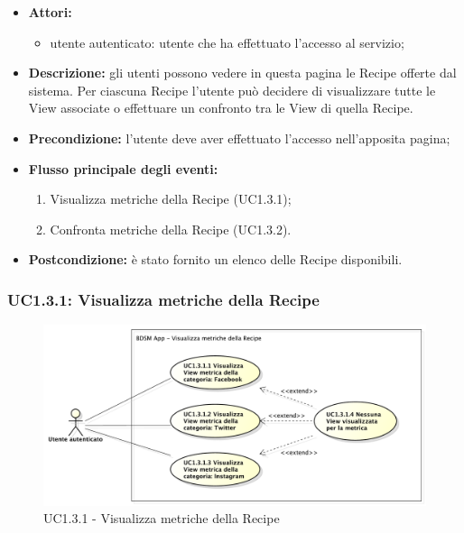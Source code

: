 \begin{itemize}
	\item \textbf{Attori:}
	\begin{itemize}
		\item utente autenticato: utente che ha effettuato l'accesso al servizio;
	\end{itemize}
	\item \textbf{Descrizione:} gli utenti possono vedere in questa pagina le Recipe offerte dal sistema. Per ciascuna Recipe l'utente può decidere di visualizzare tutte le View associate o effettuare un confronto tra le View di quella Recipe.
	\item \textbf{Precondizione:} l'utente deve aver effettuato l'accesso nell'apposita pagina;
	\item \textbf{Flusso principale degli eventi:}
	\begin{enumerate}
		\item Visualizza metriche della Recipe (UC1.3.1);
		\item Confronta metriche della Recipe (UC1.3.2).
	\end{enumerate}
	\item \textbf{Postcondizione:} è stato fornito un elenco delle Recipe disponibili.
\end{itemize}

\subsubsection{UC1.3.1: Visualizza metriche della Recipe}
\begin{figure}[!htbp]
	\centering
	\centerline{\includegraphics[scale=0.45]{./images/UC1_3_1.pdf}}
	\caption{UC1.3.1 - Visualizza metriche della Recipe}
\end{figure}

